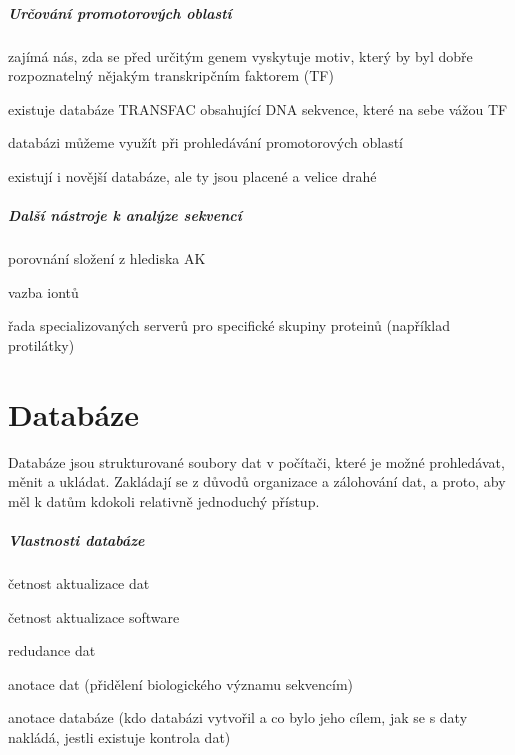 \documentclass[DIV=8]{scrreprt}
\begin{document}
\paragraph{Určování promotorových oblastí}
\begin{myItemize}[nosep]
    \item zajímá nás, zda se před určitým genem vyskytuje motiv, který by byl dobře rozpoznatelný nějakým transkripčním faktorem (TF)
    \item existuje databáze TRANSFAC obsahující DNA sekvence, které na sebe vážou TF
\begin{myItemize}[nosep]
    \item databázi můžeme využít při prohledávání promotorových oblastí
\end{myItemize}

    \item existují i novější databáze, ale ty jsou placené a velice drahé
\end{myItemize}



\paragraph{Další nástroje k analýze sekvencí}
\begin{myItemize}[nosep]
    \item porovnání složení z hlediska AK
    \item vazba iontů
    \item řada specializovaných serverů pro specifické skupiny proteinů (například protilátky)
\end{myItemize}



\chapter{Databáze} \label{Databáze}


Databáze jsou strukturované soubory dat v počítači, které je možné prohledávat, měnit a ukládat. Zakládají se z důvodů organizace a zálohování dat, a proto, aby měl k datům kdokoli relativně jednoduchý přístup.

\paragraph{Vlastnosti databáze}
\begin{myItemize}[nosep]
    \item četnost aktualizace dat
    \item četnost aktualizace software
    \item redudance dat
    \item anotace dat (přidělení biologického významu sekvencím)
    \item anotace databáze (kdo databázi vytvořil a co bylo jeho cílem, jak se s daty nakládá, jestli existuje kontrola dat)
\end{myItemize}
\end{document}
